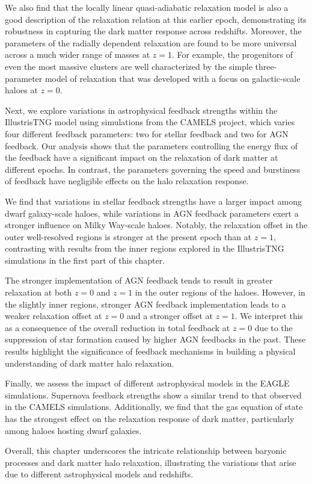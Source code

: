 We also find that the locally linear quasi-adiabatic relaxation model is also a good description of the relaxation relation at this earlier epoch, demonstrating its robustness in capturing the dark matter response across redshifts. Moreover, the parameters of the radially dependent relaxation are found to be more universal across a much wider range of masses at \( z=1 \). For example, the progenitors of even the most massive clusters are well characterized by the simple three-parameter model of relaxation that was developed with a focus on galactic-scale haloes at \( z=0 \).

Next, we explore variations in astrophysical feedback strengths within the IllustrisTNG model using simulations from the CAMELS project, which varies four different feedback parameters: two for stellar feedback and two for AGN feedback. Our analysis shows that the parameters controlling the energy flux of the feedback have a significant impact on the relaxation of dark matter at different epochs. In contrast, the parameters governing the speed and burstiness of feedback have negligible effects on the halo relaxation response.

We find that variations in stellar feedback strengths have a larger impact among dwarf galaxy-scale haloes, while variations in AGN feedback parameters exert a stronger influence on Milky Way-scale haloes. Notably, the relaxation offset in the outer well-resolved regions is stronger at the present epoch than at \( z=1 \), contrasting with results from the inner regions explored in the IllustrisTNG simulations in the first part of this chapter.

The stronger implementation of AGN feedback tends to result in greater relaxation at both \( z=0 \) and \( z=1 \) in the outer regions of the haloes. However, in the slightly inner regions, stronger AGN feedback implementation leads to a weaker relaxation offset at \( z=0 \) and a stronger offset at \( z=1 \). We interpret this as a consequence of the overall reduction in total feedback at \( z=0 \) due to the suppression of star formation caused by higher AGN feedbacks in the past. These results highlight the significance of feedback mechanisms in building a physical understanding of dark matter halo relaxation.

Finally, we assess the impact of different astrophysical models in the EAGLE simulations. Supernova feedback strengths show a similar trend to that observed in the CAMELS simulations. Additionally, we find that the gas equation of state has the strongest effect on the relaxation response of dark matter, particularly among haloes hosting dwarf galaxies.

Overall, this chapter underscores the intricate relationship between baryonic processes and dark matter halo relaxation, illustrating the variations that arise due to different astrophysical models and redshifts.